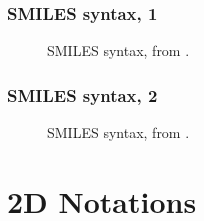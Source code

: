 \documentclass{beamer}
\begin{document}
\begin{frame}
\frametitle{SMILES syntax, 1}

\begin{figure}[h!]
\caption{SMILES syntax, from \cite{gasteiger2006chemoinformatics}.}
\end{figure}
\end{frame}

\begin{frame}
\frametitle{SMILES syntax, 2}
\begin{figure}[h!]
\caption{SMILES syntax, from \cite{gasteiger2006chemoinformatics}.}
\end{figure}
\end{frame}

\section{2D Notations} %
\end{document}
